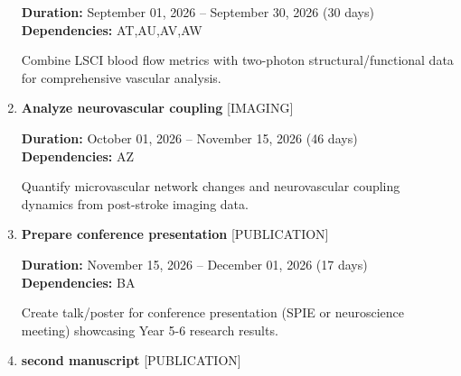 \documentclass[landscape,a4paper]{article}
\begin{document}
\begin{enumerate}[leftmargin=1.5cm, itemsep=1em, parsep=0.5em]
          \vspace{0.2em}
          \textcolor{black!70}{\textbf{Duration:} September 01, 2026 -- September 30, 2026 (30 days)}
          \\[0.2em]\textcolor{black!70}{\textbf{Dependencies:} AT,AU,AV,AW}\n
          \vspace{0.4em}
          \begin{minipage}[t]{0.9\textwidth}
          \textcolor{black!85}{Combine LSCI blood flow metrics with two-photon structural/functional data for comprehensive vascular analysis.}
          \end{minipage}

    \item \textcolor{other}{\textbf{\large Analyze neurovascular coupling}}
          \hfill \textcolor{black!60}{\small [IMAGING]}
          
          \vspace{0.2em}
          \textcolor{black!70}{\textbf{Duration:} October 01, 2026 -- November 15, 2026 (46 days)}
          \\[0.2em]\textcolor{black!70}{\textbf{Dependencies:} AZ}\n
          \vspace{0.4em}
          \begin{minipage}[t]{0.9\textwidth}
          \textcolor{black!85}{Quantify microvascular network changes and neurovascular coupling dynamics from post-stroke imaging data.}
          \end{minipage}

    \item \textcolor{researchout}{\textbf{\large Prepare conference presentation}}
          \hfill \textcolor{black!60}{\small [PUBLICATION]}
          
          \vspace{0.2em}
          \textcolor{black!70}{\textbf{Duration:} November 15, 2026 -- December 01, 2026 (17 days)}
          \\[0.2em]\textcolor{black!70}{\textbf{Dependencies:} BA}\n
          \vspace{0.4em}
          \begin{minipage}[t]{0.9\textwidth}
          \textcolor{black!85}{Create talk/poster for conference presentation (SPIE or neuroscience meeting) showcasing Year 5-6 research results.}
          \end{minipage}

    \item \textcolor{researchout}{\textbf{\large second manuscript}}
          \hfill \textcolor{black!60}{\small [PUBLICATION]}
          

\end{enumerate}
\end{document}
